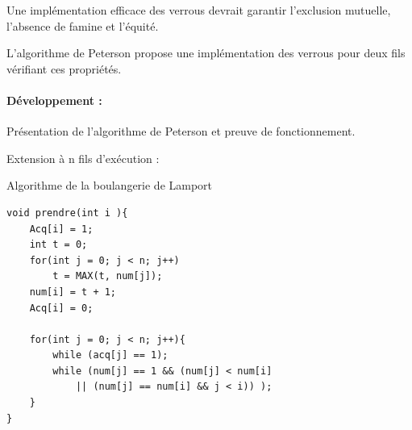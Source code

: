 \begin{proposition}
	Une implémentation efficace des verrous devrait garantir l'exclusion mutuelle, l'absence de famine et l'équité.
\end{proposition}

\begin{algo}
	L'algorithme de Peterson propose une implémentation des verrous pour deux fils vérifiant ces propriétés.
\end{algo}

\paragraph{Développement :} Présentation de l'algorithme de Peterson et preuve de fonctionnement.

Extension à n fils d'exécution :
\begin{algo} \normalfont Algorithme de la boulangerie de Lamport\\
\begin{minipage}{0.6\linewidth}
	\begin{lstlisting}[style=CStyle]   
void prendre(int i ){
	Acq[i] = 1;
	int t = 0;
	for(int j = 0; j < n; j++)
		t = MAX(t, num[j]);
	num[i] = t + 1;
	Acq[i] = 0;
	
	for(int j = 0; j < n; j++){
		while (acq[j] == 1);
		while (num[j] == 1 && (num[j] < num[i] 
			|| (num[j] == num[i] && j < i)) );
	}
}


\end{lstlisting}
\end{minipage}
\end{algo}
